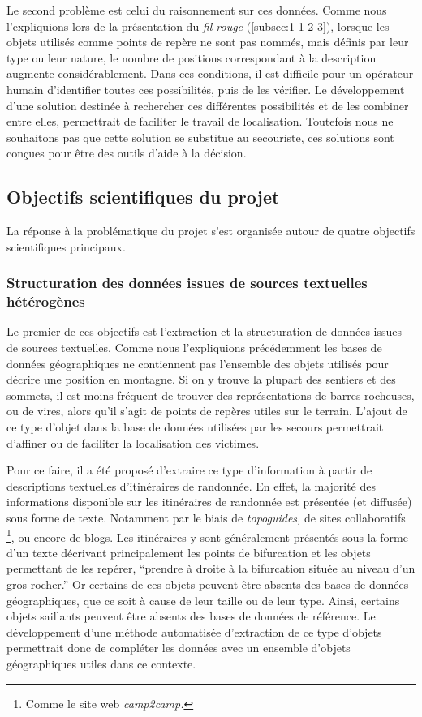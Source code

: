 Le second problème est celui du raisonnement sur ces données. Comme
nous l'expliquions lors de la présentation du \emph{fil rouge}
(\ref{subsec:1-1-2-3}), lorsque les objets utilisés comme points de
repère ne sont pas nommés, mais définis par leur type ou leur nature,
le nombre de positions correspondant à la description augmente
considérablement. Dans ces conditions, il est difficile pour un
opérateur humain d'identifier toutes ces possibilités, puis de les
vérifier. Le développement d'une solution destinée à rechercher ces
différentes possibilités et de les combiner entre elles, permettrait
de faciliter le travail de localisation. Toutefois nous ne souhaitons
pas que cette solution se substitue au secouriste, ces solutions sont
conçues pour être des outils d'aide à la décision.

\subsection{Objectifs scientifiques du projet}
\label{subsec:1-2-3}

La réponse à la problématique du projet s'est organisée autour de
quatre objectifs scientifiques principaux.

\subsubsection{Structuration des données issues de sources textuelles
  hétérogènes}

Le premier de ces objectifs est l'extraction et la structuration de
données issues de sources textuelles. Comme nous l’expliquions
précédemment les bases de données géographiques ne contiennent pas
l'ensemble des objets utilisés pour décrire une position en
montagne. Si on y trouve la plupart des sentiers et des sommets, il
est moins fréquent de trouver des représentations de barres rocheuses,
ou de vires, alors qu'il s'agit de points de repères utiles sur le
terrain. L'ajout de ce type d'objet dans la base de données utilisées
par les secours permettrait d’affiner ou de faciliter la localisation
des victimes.

Pour ce faire, il a été proposé d'extraire ce type d'information à
partir de descriptions textuelles d'itinéraires de randonnée. En
effet, la majorité des informations disponible sur les itinéraires de
randonnée est présentée (et diffusée) sous forme de texte. Notamment
par le biais de \emph{topoguides,} de sites collaboratifs
\footnote{Comme le site web \emph{camp2camp.}}, ou encore de
blogs. Les itinéraires y sont généralement présentés sous la forme
d'un texte décrivant principalement les points de bifurcation et les
objets permettant de les repérer, \eg \enquote{prendre à droite à la
  bifurcation située au niveau d'un gros rocher.} Or certains de ces
objets peuvent être absents des bases de données géographiques, que ce
soit à cause de leur taille ou de leur type. Ainsi, certains objets
saillants peuvent être absents des bases de données de référence. Le
développement d'une méthode automatisée d'extraction de ce type
d'objets permettrait donc de compléter les données avec un ensemble
d'objets géographiques utiles dans ce contexte.


